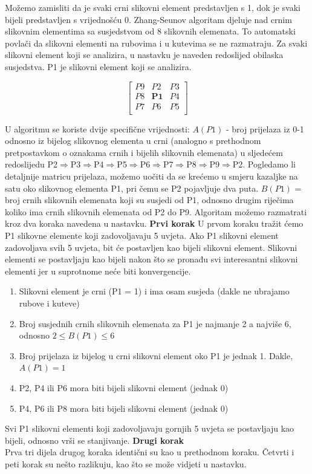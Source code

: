 \documentclass[times, utf8, diplomski]{fer}
\theoremstyle{definition}
\begin{document}
Možemo zamisliti da je svaki crni slikovni element predstavljen s 1, dok je svaki bijeli predstavljen s vrijednošću 0. Zhang-Seunov algoritam djeluje nad crnim slikovnim elementima sa susjedstvom od 8 slikovnih elemenata. To automatski povlači da slikovni elementi na rubovima i u kutevima se ne razmatraju. Za svaki slikovni element koji se analizira, u nastavku je naveden redoslijed obilaska susjedstva. P1 je slikovni element koji se analizira.

\[
\begin{bmatrix}
P9 & P2 & P3 \\
P8 & \textbf{P1} & P4 \\
P7 & P6 & P5 \\
\end{bmatrix}
\]

U algoritmu se koriste dvije specifične vrijednosti:\newline
$A(P1)$ - broj prijelaza iz 0-1 odnosno iz bijelog slikovnog elementa u crni (analogno s prethodnom pretpostavkom o oznakama crnih i bijelih slikovnih elemenata) u sljedećem redoslijedu P2$\Rightarrow$P3$\Rightarrow$P4$\Rightarrow$P5$\Rightarrow$P6$\Rightarrow$P7$\Rightarrow$P8$\Rightarrow$P9$\Rightarrow$P2. Pogledamo li detaljnije matricu prijelaza, možemo uočiti da se krećemo u smjeru kazaljke na satu oko slikovnog elementa P1, pri čemu se P2 pojavljuje dva puta.\newline
$B(P1)$ = broj crnih slikovnih elemenata koji su susjedi od P1, odnosno drugim riječima koliko ima crnih slikovnih elemenata od P2 do P9.
\newline
\newline
Algoritam možemo razmatrati kroz dva koraka navedena u nastavku.
\newline
\textbf{Prvi korak}
\newline
U prvom koraku tražit ćemo P1 slikovne elemente koji zadovoljavaju 5 uvjeta. Ako P1 slikovni element zadovoljava svih 5 uvjeta, bit će postavljen kao bijeli slikovni element. Slikovni elementi se postavljaju kao bijeli nakon što se pronađu svi interesantni slikovni elementi jer u suprotnome neće biti konvergencije.

\begin{enumerate}
\item Slikovni element je crni (P1 = 1) i ima osam susjeda (dakle ne ubrajamo rubove i kuteve)
\item Broj susjednih crnih slikovnih elemenata  za P1 je najmanje 2 a najviše 6, odnosno $2\leq B(P1)\leq6$
\item Broj prijelaza iz bijelog u crni slikovni element oko P1 je jednak 1. Dakle, $A(P1) = 1$
\item P2, P4 ili P6 mora biti bijeli slikovni element (jednak 0)
\item P4, P6 ili P8 mora biti bijeli slikovni element (jednak 0)
\end{enumerate}
Svi P1 slikovni elementi koji zadovoljavaju gornjih 5 uvjeta se postavljaju kao bijeli, odnosno vrši se stanjivanje.
\newline
\textbf{Drugi korak}
\\
Prva tri dijela drugog koraka identični su kao u prethodnom koraku. Četvrti i peti korak su nešto razlikuju, kao što se može vidjeti u nastavku.
\end{document}
